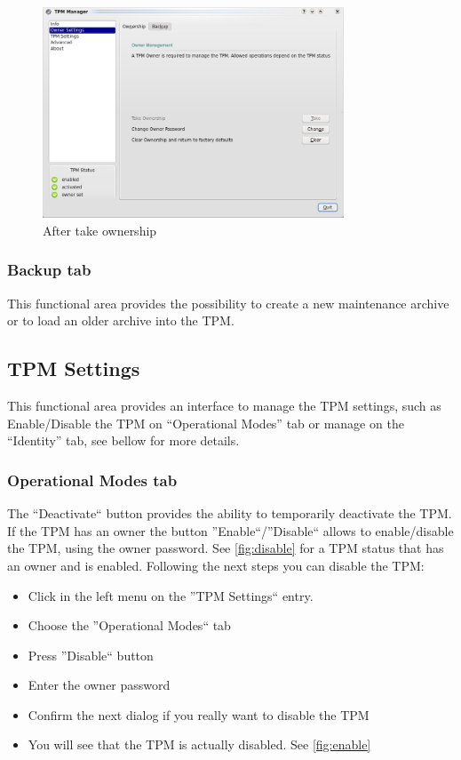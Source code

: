\documentclass[
  american        %
]{sirrixreport}
\begin{document}
\begin{figure}[h]
 \centering
   \includegraphics[width=0.8\textwidth]{images/tpmmanager_owner.jpg}
   \caption{After take ownership}
\label{fig:take2}
\end{figure}
\clearpage
\subsubsection{Backup tab} This functional area provides the possibility to create a new maintenance archive or to load an older archive into the TPM.

\subsection{TPM Settings} This functional area provides an interface to manage the TPM settings, such as Enable/Disable the TPM on ``Operational Modes'' tab or manage \AIK on the ``Identity'' tab, see bellow for more details. 
   \subsubsection{Operational Modes tab} The ``Deactivate`` button provides the ability to temporarily deactivate the TPM. If the TPM has an owner the button ''Enable``/''Disable`` allows to enable/disable the TPM, using the owner password. See \autoref{fig:disable} for a TPM status that has an owner and is enabled. Following the next steps you can disable the TPM:

\begin{itemize}
   \item Click in the left menu on the ''TPM Settings`` entry.
   \item Choose the ''Operational Modes`` tab
   \item Press ''Disable`` button
   \item Enter the owner password
   \item Confirm the next dialog if you really want to disable the TPM
   \item You will see that the TPM is actually disabled. See \autoref{fig:enable}
\end{itemize}
\end{document}

